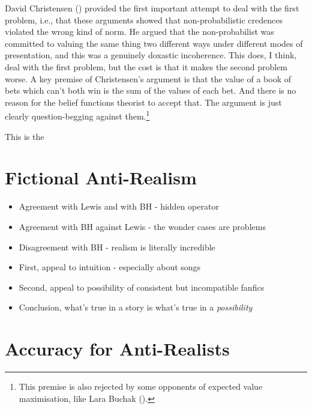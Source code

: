 \documentclass[
  11pt,
  letterpaper,
  DIV=11,
  numbers=noendperiod,
  twoside]{scrartcl}
\providecommand{\tightlist}{%
  \setlength{\itemsep}{0pt}\setlength{\parskip}{0pt}}
\begin{document}
David Christensen () provided the
first important attempt to deal with the first problem, i.e., that these
arguments showed that non-probabilistic credences violated the wrong
kind of norm. He argued that the non-probabilist was committed to
valuing the same thing two different ways under different modes of
presentation, and this was a genuinely doxastic incoherence. This does,
I think, deal with the first problem, but the cost is that it makes the
second problem worse. A key premise of Christensen's argument is that
the value of a book of bets which can't both win is the sum of the
values of each bet. And there is no reason for the belief functions
theorist to accept that. The argument is just clearly question-begging
against them.\footnote{This premise is also rejected by some opponents
  of expected value maximisation, like Lara Buchak
  ().}

This is the

\section{Fictional Anti-Realism}\label{sec-fiction}

\begin{itemize}
\tightlist
\item
  Agreement with Lewis and with BH - hidden operator
\item
  Agreement with BH against Lewis - the wonder cases are problems
\item
  Disagreement with BH - realism is literally incredible
\item
  First, appeal to intuition - especially about songs
\item
  Second, appeal to possibility of consistent but incompatible fanfics
\item
  Conclusion, what's true in a story is what's true in a
  \emph{possibility}
\end{itemize}

\section{Accuracy for Anti-Realists}\label{sec-realism}
\end{document}
